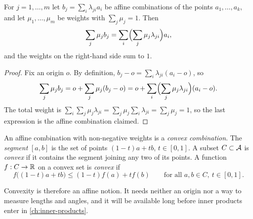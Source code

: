 \begin{notechapter}
\begin{proposition}
\label{affine-spaces:prop:associativity}
For $j = 1,\dots,m$ let $b_j = \sum_i\lambda_{ji}a_i$ be affine combinations
of the points $a_1,\dots,a_k$, and let $\mu_1,\dots,\mu_m$ be weights with
$\sum_j\mu_j = 1$. Then
\[
  \sum_j\mu_jb_j = \sum_i\Bigl(\sum_j\mu_j\lambda_{ji}\Bigr)a_i ,
\]
and the weights on the right-hand side sum to $1$.
\end{proposition}

\begin{proof}
Fix an origin $o$. By definition, $b_j - o = \sum_i\lambda_{ji}(a_i - o)$,
so
\[
  \sum_j\mu_jb_j = o + \sum_j\mu_j(b_j - o)
  = o + \sum_i\Bigl(\sum_j\mu_j\lambda_{ji}\Bigr)(a_i - o) .
\]
The total weight is
$\sum_i\sum_j\mu_j\lambda_{ji} = \sum_j\mu_j\sum_i\lambda_{ji}
= \sum_j\mu_j = 1$,
so the last expression is the affine combination claimed.
\end{proof}

\begin{definition}
\label{affine-spaces:def:convex}
An affine combination with non-negative weights is a \emph{convex
combination}. The \emph{segment} $[a, b]$ is the set of points
$(1 - t)a + tb$, $t\in[0, 1]$. A subset $C\subset\mathcal{A}$ is \emph{convex} if
it contains the segment joining any two of its points. A function
$f:C\to\mathbb{R}$ on a convex set is \emph{convex} if
\[
  f\bigl((1 - t)a + tb\bigr)\leq(1 - t)f(a) + tf(b)
  \qquad\text{for all }a, b\in C,\ t\in[0, 1] .
\]
\end{definition}

Convexity is therefore an affine notion. It needs neither an origin nor a
way to measure lengths and angles, and it will be available long before
inner products enter in \cref{ch:inner-products}.


\end{notechapter}
